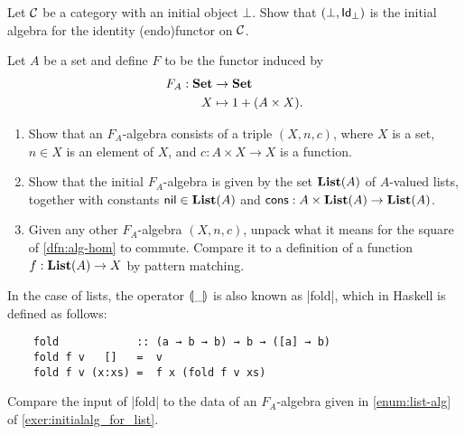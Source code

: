 \begin{exer}\label{exer:initialalg_for_idfun_with_initialob} Let $\CC$ be a category with an initial object $\bot$. Show that $(\bot, \Id[\bot])$ is the initial algebra for the identity (endo)functor on $\CC$.
\end{exer}

\begin{exer}\label{exer:initialalg_for_list}
  Let $A$ be a set and define $F$ to be the functor induced by 
\begin{align*}
  F_A:\SET &\to\SET
\\
  X &\mapsto 1 + (A\times X).
\end{align*}

\begin{enumerate}
\item \label{enum:list-alg} Show that an $F_A$-algebra consists of a triple $(X,n,c)$, where $X$ is a set, $n\in X$ is an element of $X$, and $c : A \times X \to X$ is a function.
\item Show that the initial $F_A$-algebra is given by the set $\List(A)$ of $A$-valued lists, together with constants $\nil \in \List(A)$ and $\cons : A \times \List(A) \to \List(A)$.
\item Given any other $F_A$-algebra $(X,n,c)$, unpack what it means for the square of \cref{dfn:alg-hom} to commute.
Compare it to a definition of a function $f : \List(A) \to X$ by pattern matching.
\end{enumerate}

\end{exer}

\begin{rem}
  In the case of lists, the operator $\catam{\_}$ is also known as |fold|, which in Haskell is defined as follows:
  \begin{lstlisting}
    fold            :: (a → b → b) → b → ([a] → b)
    fold f v   []   =  v
    fold f v (x:xs) =  f x (fold f v xs)
  \end{lstlisting}
  Compare the input of |fold| to the data of an $F_A$-algebra given in \cref{enum:list-alg} of \cref{exer:initialalg_for_list}.
\end{rem}



